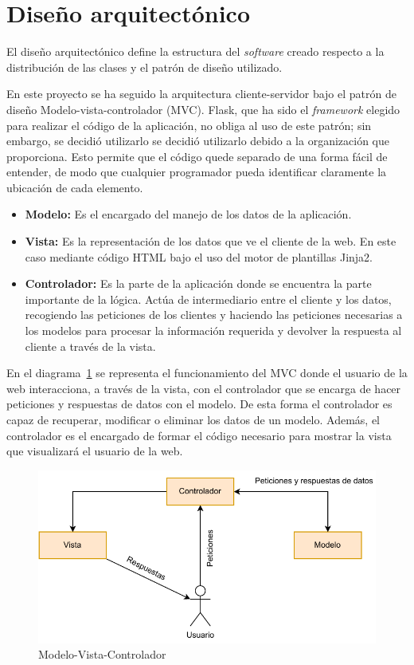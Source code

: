 \section{Diseño arquitectónico}
El diseño arquitectónico define la estructura del \textit{software} creado respecto a la distribución de las clases y el patrón de diseño utilizado.

En este proyecto se ha seguido la arquitectura cliente-servidor bajo el patrón de diseño Modelo-vista-controlador (MVC).
Flask, que ha sido el \textit{framework} elegido para realizar el código de la aplicación, no obliga al uso de este patrón; sin embargo, se decidió utilizarlo se decidió utilizarlo debido a la organización que proporciona. 
Esto permite que el código quede separado de una forma fácil de entender, de modo que cualquier programador pueda identificar claramente la ubicación de cada elemento.

\begin{itemize}
\item \textbf{Modelo:}
Es el encargado del manejo de los datos de la aplicación.

\item \textbf{Vista:} 
Es la representación de los datos que ve el cliente de la web.
En este caso mediante código HTML bajo el uso del motor de plantillas Jinja2.

\item \textbf{Controlador:} 
Es la parte de la aplicación donde se encuentra la parte importante de la lógica.
Actúa de intermediario entre el cliente y los datos, recogiendo las peticiones de los clientes y haciendo las peticiones necesarias a los modelos para procesar la información requerida y devolver la respuesta al cliente a través de la vista.
\end{itemize}

En el diagrama~\ref{MVC} se representa el funcionamiento del MVC donde el usuario de la web interacciona, a través de la vista, con el controlador que se encarga de hacer peticiones y respuestas de datos con el modelo.
De esta forma el controlador es capaz de recuperar, modificar o eliminar los datos de un modelo.
Además, el controlador es el encargado de formar el código necesario para mostrar la vista que visualizará el usuario de la web.

\begin{figure}
	\centering
	\includegraphics[width=\textwidth]{../img/Anexos/MVC.pdf}
	\caption{Modelo-Vista-Controlador}\label{MVC}
\end{figure}

